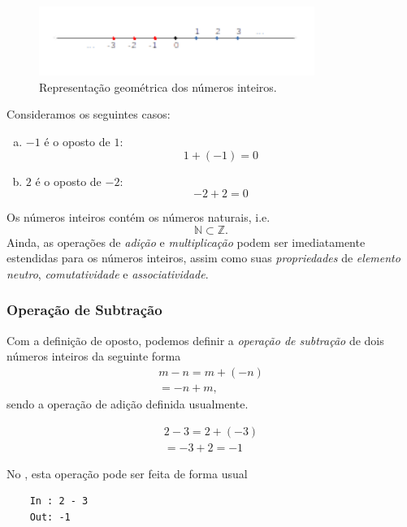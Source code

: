 \begin{figure}[H]
  \centering
  \includegraphics[width=0.8\textwidth]{./cap_numreal/dados/fig_reprgeoZ/main}
  \caption{Representação geométrica dos números inteiros.}
  \label{fig:reprgeoZ}
\end{figure}

\begin{ex}
  Consideramos os seguintes casos:
  \begin{enumerate}[a)]
  \item $-1$ é o oposto de $1$:
    \begin{equation}
      1 + (-1) = 0
    \end{equation}
  \item $2$ é o oposto de $-2$:
    \begin{equation}
      -2 + 2 = 0
    \end{equation}
  \end{enumerate}
\end{ex}

Os números inteiros contém os números naturais, i.e.
\begin{equation}
  \mathbb{N} \subset \mathbb{Z}.
\end{equation}
Ainda, as operações de \emph{adição} e \emph{multiplicação} podem ser imediatamente estendidas para os números inteiros, assim como suas \emph{propriedades} de \emph{elemento neutro}, \emph{comutatividade} e \emph{associatividade}.

\subsubsection{Operação de Subtração}

Com a definição de oposto, podemos definir a \emph{operação de subtração} de dois números inteiros da seguinte forma
\begin{gather}
  m - n = m + (-n) \\
  = -n + m,
\end{gather}
sendo a operação de adição definida usualmente.

\begin{ex}
  \begin{gather}
    2 - 3 = 2 + (-3) \\
    = -3 + 2 = -1
  \end{gather}

  \ifispython
  No \python, esta operação pode ser feita de forma usual
  \begin{lstlisting}
    In : 2 - 3
    Out: -1
  \end{lstlisting}
  \fi
\end{ex}

